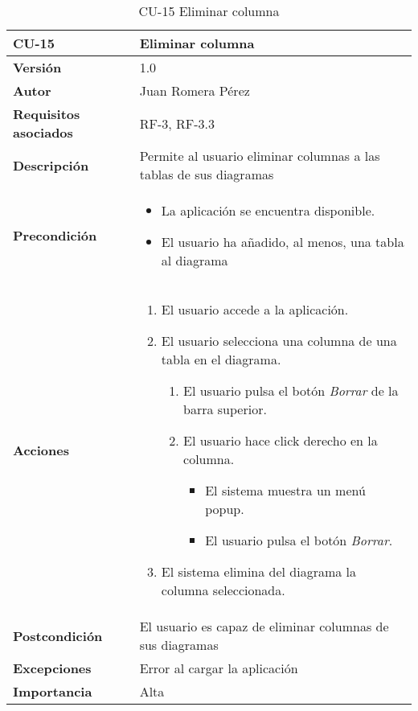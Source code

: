 \begin{table}[p]
    \centering
    \begin{tabularx}{\linewidth}{ p{} p{}}
		\toprule
		\textbf{CU-15}    & \textbf{Eliminar columna}\\
		\toprule
		\textbf{Versión}              & 1.0    \\
		\textbf{Autor}                & Juan Romera Pérez \\
		\textbf{Requisitos asociados} & RF-3, RF-3.3 \\
		\textbf{Descripción}          & Permite al usuario eliminar columnas a las tablas de sus diagramas \\
		\textbf{Precondición}         & \begin{itemize}
		    \item La aplicación se encuentra disponible.
            \item El usuario ha añadido, al menos, una tabla al diagrama
		\end{itemize} \\
		\textbf{Acciones}             &
		\begin{enumerate}
			\def\labelenumi{\arabic{enumi}.}
			\tightlist
			\item El usuario accede a la aplicación.
            \item El usuario selecciona una columna de una tabla en el diagrama.
            \begin{enumerate}
                \item El usuario pulsa el botón \emph{Borrar} de la barra superior.
                \item El usuario hace click derecho en la columna.
                \begin{itemize}
                    \item El sistema muestra un menú popup.
                    \item El usuario pulsa el botón \emph{Borrar}.
                \end{itemize}
            \end{enumerate}
            \item El sistema elimina del diagrama la columna seleccionada.
		\end{enumerate}\\
		\textbf{Postcondición}        & El usuario es capaz de eliminar columnas de sus diagramas \\
		\textbf{Excepciones}          & Error al cargar la aplicación \\
		\textbf{Importancia}          & Alta \\
		\bottomrule
    \end{tabularx}
    \caption{CU-15 Eliminar columna}
\end{table}

